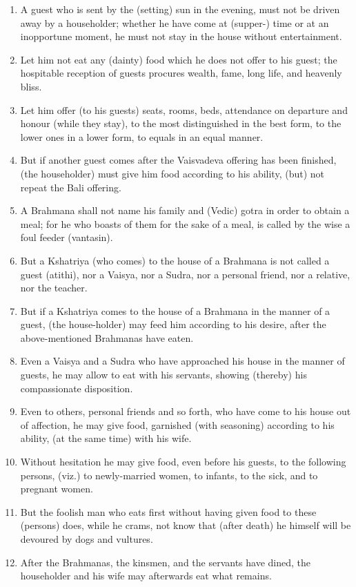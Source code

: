 \begin{enumerate}
\item A guest who is sent by the (setting) sun in the evening, must not be driven away by a householder; whether he have come at (supper-) time or at an inopportune moment, he must not stay in the house without entertainment.
\item Let him not eat any (dainty) food which he does not offer to his guest; the hospitable reception of guests procures wealth, fame, long life, and heavenly bliss.
\item Let him offer (to his guests) seats, rooms, beds, attendance on departure and honour (while they stay), to the most distinguished in the best form, to the lower ones in a lower form, to equals in an equal manner.
\item But if another guest comes after the Vaisvadeva offering has been finished, (the householder) must give him food according to his ability, (but) not repeat the Bali offering.
\item A Brahmana shall not name his family and (Vedic) gotra in order to obtain a meal; for he who boasts of them for the sake of a meal, is called by the wise a foul feeder (vantasin).
\item But a Kshatriya (who comes) to the house of a Brahmana is not called a guest (atithi), nor a Vaisya, nor a Sudra, nor a personal friend, nor a relative, nor the teacher.
\item But if a Kshatriya comes to the house of a Brahmana in the manner of a guest, (the house-holder) may feed him according to his desire, after the above-mentioned Brahmanas have eaten.
\item Even a Vaisya and a Sudra who have approached his house in the manner of guests, he may allow to eat with his servants, showing (thereby) his compassionate disposition.
\item Even to others, personal friends and so forth, who have come to his house out of affection, he may give food, garnished (with seasoning) according to his ability, (at the same time) with his wife.
\item Without hesitation he may give food, even before his guests, to the following persons, (viz.) to newly-married women, to infants, to the sick, and to pregnant women.
\item But the foolish man who eats first without having given food to these (persons) does, while he crams, not know that (after death) he himself will be devoured by dogs and vultures.
\item After the Brahmanas, the kinsmen, and the servants have dined, the householder and his wife may afterwards eat what remains.

\end{enumerate}
